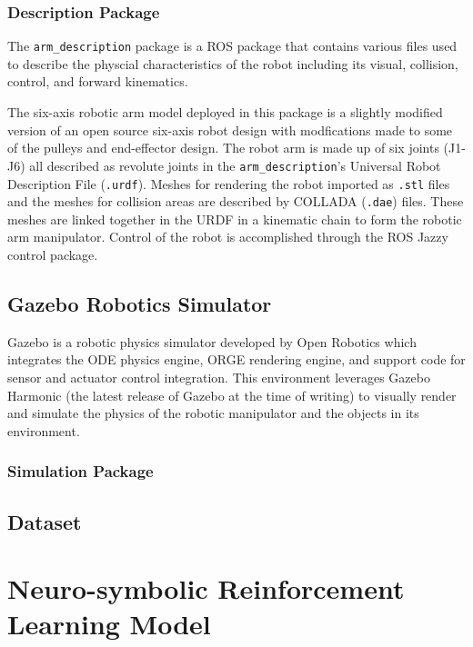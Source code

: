 \documentclass[doublespace,draft,nopageskip]{VTthesis} %
\begin{document}
    \subsection{Description Package} \label{ss:description_package}
    The \texttt{arm\_description} package is a ROS package that contains various files used to describe the physcial characteristics of the robot including its visual, collision, control, and forward kinematics.

    The six-axis robotic arm model deployed in this package is a slightly modified version of an open source six-axis robot design with modfications made to some of the pulleys and end-effector design. The robot arm is made up of six joints (J1-J6) all described as revolute joints in the \texttt{arm\_description}'s Universal Robot Description File (\texttt{.urdf}). Meshes for rendering the robot imported as \texttt{.stl} files and the meshes for collision areas are described by COLLADA (\texttt{.dae}) files. These meshes are linked together in the URDF in a kinematic chain to form the robotic arm manipulator.
    Control of the robot is accomplished through the ROS Jazzy control package.
    \section{Gazebo Robotics Simulator} \label{se:gazebo_harmonic_robotics_simulator}
        Gazebo is a robotic physics simulator developed by Open Robotics which integrates the ODE physics engine, ORGE rendering engine, and support code for sensor and actuator control integration. This environment leverages Gazebo Harmonic (the latest release of Gazebo at the time of writing) to visually render and simulate the physics of the robotic manipulator and the objects in its environment. 
    \subsection{Simulation Package} \label{ss:simulation_package}
    \section{Dataset} \label{se:dataset}
  
    \chapter{Neuro-symbolic Reinforcement Learning Model}
\end{document}

